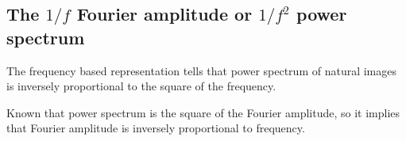 \documentclass[12pt]{article}
\begin{document}
\subsection{The $1/f$ Fourier amplitude or $1/f^2$ power spectrum}

The frequency based representation tells that power spectrum of natural images is inversely proportional to the square of the frequency.

\noindent Known that power spectrum is the square of the Fourier amplitude, so it implies that Fourier amplitude is inversely proportional to frequency.
\end{document}
